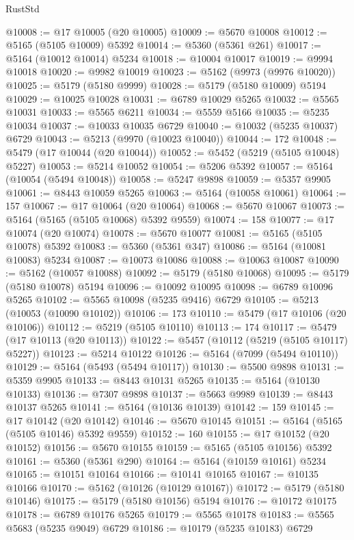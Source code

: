 \begin{lexlean}{RustStd}
\begin{coremodule}
@10008 := @17 @10005 (@20 @10005)
@10009 := @5670 @10008
@10012 := @5165 (@5105 @10009) @5392
@10014 := @5360 (@5361 @261)
@10017 := @5164 (@10012 @10014) @5234
@10018 := @10004 @10017
@10019 := @9994 @10018
@10020 := @9982 @10019
@10023 := @5162 (@9973 (@9976 @10020))
@10025 := @5179 (@5180 @9999)
@10028 := @5179 (@5180 @10009) @5194
@10029 := @10025 @10028
@10031 := @6789 @10029 @5265
@10032 := @5565 @10031
@10033 := @5565 @6211
@10034 := @5559 @5166
@10035 := @5235 @10034
@10037 := @10033 @10035 @6729
@10040 := @10032 (@5235 @10037) @6729
@10043 := @5213 (@9970 (@10023 @10040))
@10044 := 172
@10048 := @5479 (@17 @10044 (@20 @10044))
@10052 := @5452 (@5219 (@5105 @10048) @5227)
@10053 := @5214 @10052
@10054 := @5206 @5392
@10057 := @5164 (@10054 (@5494 @10048))
@10058 := @5247 @9898
@10059 := @5357 @9905
@10061 := @8443 @10059 @5265
@10063 := @5164 (@10058 @10061)
@10064 := 157
@10067 := @17 @10064 (@20 @10064)
@10068 := @5670 @10067
@10073 := @5164 (@5165 (@5105 @10068) @5392 @9559)
@10074 := 158
@10077 := @17 @10074 (@20 @10074)
@10078 := @5670 @10077
@10081 := @5165 (@5105 @10078) @5392
@10083 := @5360 (@5361 @347)
@10086 := @5164 (@10081 @10083) @5234
@10087 := @10073 @10086
@10088 := @10063 @10087
@10090 := @5162 (@10057 @10088)
@10092 := @5179 (@5180 @10068)
@10095 := @5179 (@5180 @10078) @5194
@10096 := @10092 @10095
@10098 := @6789 @10096 @5265
@10102 := @5565 @10098 (@5235 @9416) @6729
@10105 := @5213 (@10053 (@10090 @10102))
@10106 := 173
@10110 := @5479 (@17 @10106 (@20 @10106))
@10112 := @5219 (@5105 @10110)
@10113 := 174
@10117 := @5479 (@17 @10113 (@20 @10113))
@10122 := @5457 (@10112 (@5219 (@5105 @10117) @5227))
@10123 := @5214 @10122
@10126 := @5164 (@7099 (@5494 @10110))
@10129 := @5164 (@5493 (@5494 @10117))
@10130 := @5500 @9898
@10131 := @5359 @9905
@10133 := @8443 @10131 @5265
@10135 := @5164 (@10130 @10133)
@10136 := @7307 @9898
@10137 := @5663 @9989
@10139 := @8443 @10137 @5265
@10141 := @5164 (@10136 @10139)
@10142 := 159
@10145 := @17 @10142 (@20 @10142)
@10146 := @5670 @10145
@10151 := @5164 (@5165 (@5105 @10146) @5392 @9559)
@10152 := 160
@10155 := @17 @10152 (@20 @10152)
@10156 := @5670 @10155
@10159 := @5165 (@5105 @10156) @5392
@10161 := @5360 (@5361 @290)
@10164 := @5164 (@10159 @10161) @5234
@10165 := @10151 @10164
@10166 := @10141 @10165
@10167 := @10135 @10166
@10170 := @5162 (@10126 (@10129 @10167))
@10172 := @5179 (@5180 @10146)
@10175 := @5179 (@5180 @10156) @5194
@10176 := @10172 @10175
@10178 := @6789 @10176 @5265
@10179 := @5565 @10178
@10183 := @5565 @5683 (@5235 @9049) @6729
@10186 := @10179 (@5235 @10183) @6729

\end{coremodule}
\end{lexlean}
